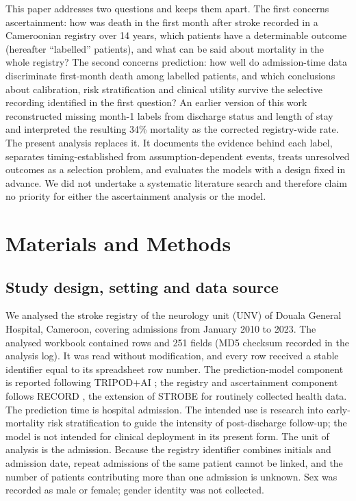\documentclass[preprint,10pt]{elsarticle}
\begin{document}
This paper addresses two questions and keeps them apart. The first concerns ascertainment: how was death in the first month after stroke recorded in a Cameroonian registry over 14 years, which patients have a determinable outcome (hereafter ``labelled'' patients), and what can be said about mortality in the whole registry? The second concerns prediction: how well do admission-time data discriminate first-month death among labelled patients, and which conclusions about calibration, risk stratification and clinical utility survive the selective recording identified in the first question? An earlier version of this work reconstructed missing month-1 labels from discharge status and length of stay and interpreted the resulting 34\% mortality as the corrected registry-wide rate. The present analysis replaces it. It documents the evidence behind each label, separates timing-established from assumption-dependent events, treats unresolved outcomes as a selection problem, and evaluates the models with a design fixed in advance. We did not undertake a systematic literature search and therefore claim no priority for either the ascertainment analysis or the model.

\section{Materials and Methods}
\subsection{Study design, setting and data source}
We analysed the stroke registry of the neurology unit (UNV) of Douala General Hospital, Cameroon, covering admissions from January 2010 to 2023. The analysed workbook contained \Nreg{} rows and 251 fields (MD5 checksum recorded in the analysis log). It was read without modification, and every row received a stable identifier equal to its spreadsheet row number. The prediction-model component is reported following TRIPOD$+$AI \cite{collins2024tripodai}; the registry and ascertainment component follows RECORD \cite{benchimol2015record}, the extension of STROBE \cite{vonelm2007strobe} for routinely collected health data. The prediction time is hospital admission. The intended use is research into early-mortality risk stratification to guide the intensity of post-discharge follow-up; the model is not intended for clinical deployment in its present form. The unit of analysis is the admission. Because the registry identifier combines initials and admission date, repeat admissions of the same patient cannot be linked, and the number of patients contributing more than one admission is unknown. Sex was recorded as male or female; gender identity was not collected.
\end{document}

